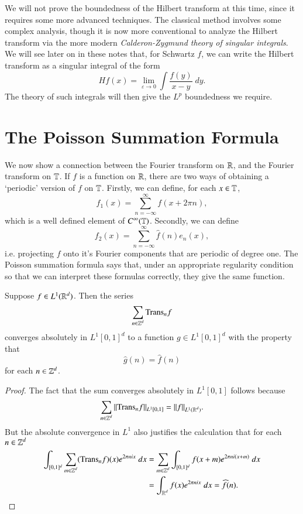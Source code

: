 We will not prove the boundedness of the Hilbert transform at this time, since it requires some more advanced techniques. The classical method involves some complex analysis, though it is now more conventional to analyze the Hilbert transform via the more modern \emph{Calderon-Zygmund theory of singular integrals}. We will see later on in these notes that, for Schwartz $f$, we can write the Hilbert transform as a singular integral of the form
%
\[ Hf(x) = \lim_{\varepsilon \to 0} \int \frac{f(y)}{x - y}\; dy. \]
%
The theory of such integrals will then give the $L^p$ boundedness we require.

\section{The Poisson Summation Formula}

We now show a connection between the Fourier transform on $\operatorname{\mathbb{R}}$, and the Fourier transform on $\operatorname{\mathbb{T}}$. If $f$ is a function on $\operatorname{\mathbb{R}}$, there are two ways of obtaining a `periodic' version of $f$ on $\operatorname{\mathbb{T}}$. Firstly, we can define, for each $x \in \operatorname{\mathbb{T}}$,
%
\[ f_1(x) = \sum_{n = -\infty}^\infty f(x + 2 \pi n), \]
%
which is a well defined element of $C^\infty(\operatorname{\mathbb{T}})$. Secondly, we can define
%
\[ f_2(x) = \sum_{n = -\infty}^\infty \widehat{f}(n) e_n(x), \]
%
i.e. projecting $f$ onto it's Fourier components that are periodic of degree one. The Poisson summation formula says that, under an appropriate regularity condition so that we can interpret these formulas correctly, they give the same function.

\begin{theorem}
    Suppose $f \in L^1(\operatorname{\mathbb{R}}^d)$. Then the series
    \[ \sum_{n \in \operatorname{\mathbb{Z}}^d} \text{Trans}_n f \]
    converges absolutely in $L^1[0,1]^d$ to a function $g \in L^1[0,1]^d$ with the property that
    \[ \widehat{g}(n) = \widehat{f}(n) \]
    for each $n \in \operatorname{\mathbb{Z}}^d$.
\end{theorem}
\begin{proof}
    The fact that the sum converges absolutely in $L^1[0,1]$ follows because
    \[ \sum_{n \in \operatorname{\mathbb{Z}}^d} \| \text{Trans}_n f \|_{L^1[0,1]} = \| f \|_{L^1(\operatorname{\mathbb{R}}^d)}. \]
    But the absolute convergence in $L^1$ also justifies the calculation that for each $n \in \operatorname{\mathbb{Z}}^d$
    \begin{align*}
        \int_{[0,1]^d} \sum_{m \in \operatorname{\mathbb{Z}}^d} (\text{Trans}_n f)(x) e^{2 \pi nix}\; dx &= \sum_{m \in \operatorname{\mathbb{Z}}^d} \int_{[0,1]^d} f(x + m) e^{2 \pi n i (x + m)}\; dx\\
        &= \int_{\operatorname{\mathbb{R}}^d} f(x) e^{2 \pi n i x}\; dx = \widehat{f}(n). \qedhere
    \end{align*}
\end{proof}

